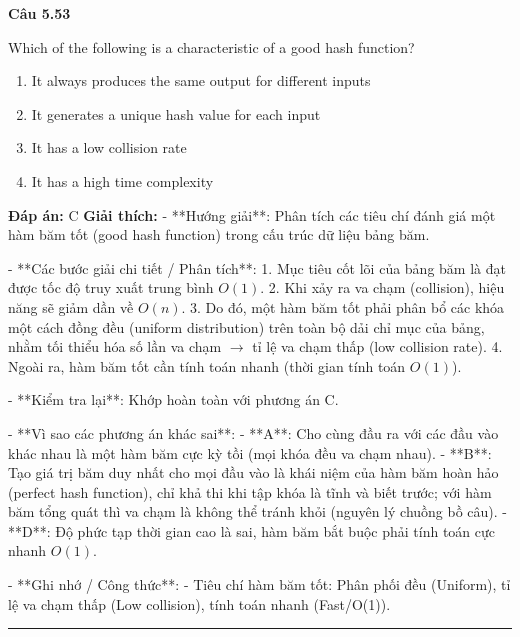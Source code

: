 \documentclass[11pt,a4paper]{article}
\newenvironment{question}[1]{%
  \par\vspace{1em}\noindent\textbf{\large Câu #1}\par\vspace{0.4em}
}{%
  \par\vspace{1em}\hrule\vspace{0.6em}
}
\newenvironment{choices}{%
  \begin{enumerate}[label=\textbf{\Alph*.},leftmargin=2.2em,itemsep=2pt,topsep=3pt]
}{%
  \end{enumerate}
}
\newcommand{\choice}{\item}
\begin{document}
\begin{question}{5.53}
Which of the following is a characteristic of a good hash function?
\begin{choices}
\choice It always produces the same output for different inputs
\choice It generates a unique hash value for each input
\choice It has a low collision rate
\choice It has a high time complexity
\end{choices}
\textbf{Đáp án:} C
\textbf{Giải thích:} - **Hướng giải**:
  Phân tích các tiêu chí đánh giá một hàm băm tốt (good hash function) trong cấu trúc dữ liệu bảng băm.

- **Các bước giải chi tiết / Phân tích**:
  1. Mục tiêu cốt lõi của bảng băm là đạt được tốc độ truy xuất trung bình \(O(1)\).
  2. Khi xảy ra va chạm (collision), hiệu năng sẽ giảm dần về \(O(n)\).
  3. Do đó, một hàm băm tốt phải phân bổ các khóa một cách đồng đều (uniform distribution) trên toàn bộ dải chỉ mục của bảng, nhằm tối thiểu hóa số lần va chạm \(\rightarrow\) tỉ lệ va chạm thấp (low collision rate).
  4. Ngoài ra, hàm băm tốt cần tính toán nhanh (thời gian tính toán \(O(1)\)).

- **Kiểm tra lại**:
  Khớp hoàn toàn với phương án C.

- **Vì sao các phương án khác sai**:
  - **A**: Cho cùng đầu ra với các đầu vào khác nhau là một hàm băm cực kỳ tồi (mọi khóa đều va chạm nhau).
  - **B**: Tạo giá trị băm duy nhất cho mọi đầu vào là khái niệm của hàm băm hoàn hảo (perfect hash function), chỉ khả thi khi tập khóa là tĩnh và biết trước; với hàm băm tổng quát thì va chạm là không thể tránh khỏi (nguyên lý chuồng bồ câu).
  - **D**: Độ phức tạp thời gian cao là sai, hàm băm bắt buộc phải tính toán cực nhanh \(O(1)\).

- **Ghi nhớ / Công thức**:
  - Tiêu chí hàm băm tốt: Phân phối đều (Uniform), tỉ lệ va chạm thấp (Low collision), tính toán nhanh (Fast/O(1)).
\end{question}
\end{document}
